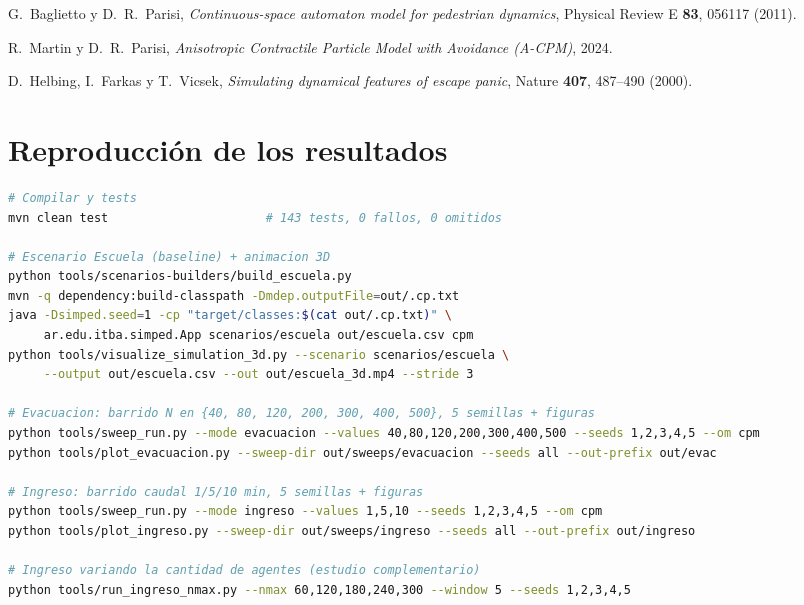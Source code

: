 \documentclass[11pt,a4paper]{article}
\begin{document}
\begin{thebibliography}{9}
G.~Baglietto y D.~R.~Parisi,
\emph{Continuous-space automaton model for pedestrian dynamics},
Physical Review E \textbf{83}, 056117 (2011).

R.~Martin y D.~R.~Parisi,
\emph{Anisotropic Contractile Particle Model with Avoidance (A-CPM)}, 2024.

D.~Helbing, I.~Farkas y T.~Vicsek,
\emph{Simulating dynamical features of escape panic},
Nature \textbf{407}, 487--490 (2000).
\end{thebibliography}

\appendix
\section{Reproducción de los resultados}
\label{sec:reproduccion}

\begin{lstlisting}[language=bash]
# Compilar y tests
mvn clean test                      # 143 tests, 0 fallos, 0 omitidos

# Escenario Escuela (baseline) + animacion 3D
python tools/scenarios-builders/build_escuela.py
mvn -q dependency:build-classpath -Dmdep.outputFile=out/.cp.txt
java -Dsimped.seed=1 -cp "target/classes:$(cat out/.cp.txt)" \
     ar.edu.itba.simped.App scenarios/escuela out/escuela.csv cpm
python tools/visualize_simulation_3d.py --scenario scenarios/escuela \
     --output out/escuela.csv --out out/escuela_3d.mp4 --stride 3

# Evacuacion: barrido N en {40, 80, 120, 200, 300, 400, 500}, 5 semillas + figuras
python tools/sweep_run.py --mode evacuacion --values 40,80,120,200,300,400,500 --seeds 1,2,3,4,5 --om cpm
python tools/plot_evacuacion.py --sweep-dir out/sweeps/evacuacion --seeds all --out-prefix out/evac

# Ingreso: barrido caudal 1/5/10 min, 5 semillas + figuras
python tools/sweep_run.py --mode ingreso --values 1,5,10 --seeds 1,2,3,4,5 --om cpm
python tools/plot_ingreso.py --sweep-dir out/sweeps/ingreso --seeds all --out-prefix out/ingreso

# Ingreso variando la cantidad de agentes (estudio complementario)
python tools/run_ingreso_nmax.py --nmax 60,120,180,240,300 --window 5 --seeds 1,2,3,4,5
\end{lstlisting}
\end{document}
